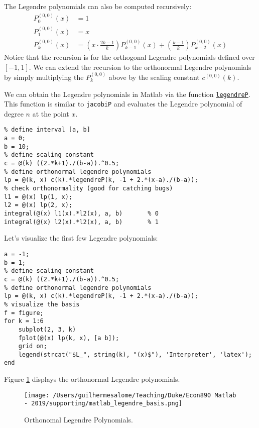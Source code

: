 \documentclass[12pt, a4paper]{article}
\begin{document}
The Legendre polynomials can also be computed recursively:
\begin{align*}
{P}_0^{(0, 0)}(x) &= 1\\
{P}_1^{(0, 0)}(x) &= x\\
{P}_k^{(0, 0)}(x) &= \left(x\cdot\frac{2k-1}{k}\right){P}_{k-1}^{(0, 0)}(x) + \left(\frac{k-1}{k}\right){P}_{k-2}^{(0, 0)}(x)
\end{align*}
Notice that the recursion is for the orthogonal Legendre polynomials defined over \([-1, 1]\).
We can extend the recursion to the orthonormal Legendre polynomials by simply multiplying the \(P_k^{(0, 0)}\) above by the scaling constant \(c^{(0, 0)}(k)\).

We can obtain the Legendre polynomials in Matlab via the function \href{https://www.mathworks.com/help/symbolic/legendrep.html?s\_tid=doc\_ta\#buei9e5-6}{\texttt{legendreP}}.
This function is similar to \texttt{jacobiP} and evaluates the Legendre polynomial of degree \(n\) at the point \(x\).
\lstset{language=matlab,label= ,caption= ,captionpos=b,firstnumber=1,numbers=left,style=Matlab-editor}
\begin{lstlisting}
% define interval [a, b]
a = 0;
b = 10;
% define scaling constant
c = @(k) ((2.*k+1)./(b-a)).^0.5;
% define orthonormal legendre polynomials
lp = @(k, x) c(k).*legendreP(k, -1 + 2.*(x-a)./(b-a));
% check orthonormality (good for catching bugs)
l1 = @(x) lp(1, x);
l2 = @(x) lp(2, x);
integral(@(x) l1(x).*l2(x), a, b)       % 0
integral(@(x) l2(x).*l2(x), a, b)       % 1
\end{lstlisting}
Let's visualize the first few Legendre polynomials:
\lstset{language=matlab,label= ,caption= ,captionpos=b,firstnumber=1,numbers=left,style=Matlab-editor}
\begin{lstlisting}
a = -1;
b = 1;
% define scaling constant
c = @(k) ((2.*k+1)./(b-a)).^0.5;
% define orthonormal legendre polynomials
lp = @(k, x) c(k).*legendreP(k, -1 + 2.*(x-a)./(b-a));
% visualize the basis
f = figure;
for k = 1:6
    subplot(2, 3, k)
    fplot(@(x) lp(k, x), [a b]);
    grid on;
    legend(strcat("$L_", string(k), "(x)$"), 'Interpreter', 'latex');
end
\end{lstlisting}
Figure \ref{fig:orgd8f8da3} displays the orthonormal Legendre polynomials.
\begin{figure}[H]
\centering
\texttt{[image: /Users/guilhermesalome/Teaching/Duke/Econ890 Matlab - 2019/supporting/matlab\_legendre\_basis.png]}
\caption{\label{fig:orgd8f8da3}
Orthonomal Legendre Polynomials.}
\end{figure}
\end{document}

